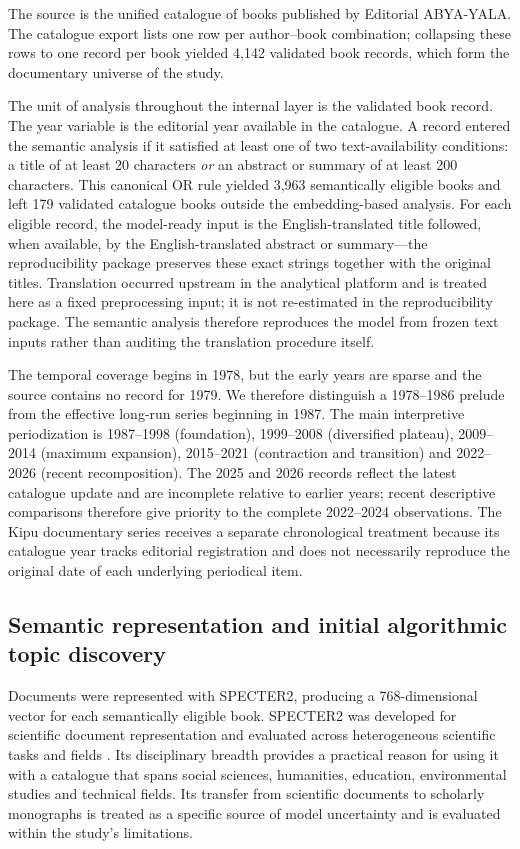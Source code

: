 \documentclass[futureinternet,article,submit,moreauthors]{Definitions/mdpi}
\newcommand{\ABYA}{ABYA-YALA\xspace}
\begin{document}
The source is the unified catalogue of books published by Editorial \ABYA. The catalogue export lists one row per author--book combination; collapsing these rows to one record per book yielded 4,142 validated book records, which form the documentary universe of the study. 

The unit of analysis throughout the internal layer is the validated book record. The year variable is the editorial year available in the catalogue. A record entered the semantic analysis if it satisfied at least one of two text-availability conditions: a title of at least 20 characters \emph{or} an abstract or summary of at least 200 characters. This canonical OR rule yielded 3,963 semantically eligible books and left 179 validated catalogue books outside the embedding-based analysis. For each eligible record, the model-ready input is the English-translated title followed, when available, by the English-translated abstract or summary---the reproducibility package preserves these exact strings together with the original titles. Translation occurred upstream in the analytical platform and is treated here as a fixed preprocessing input; it is not re-estimated in the reproducibility package. The semantic analysis therefore reproduces the model from frozen text inputs rather than auditing the translation procedure itself.

The temporal coverage begins in 1978, but the early years are sparse and the source contains no record for 1979. We therefore distinguish a 1978--1986 prelude from the effective long-run series beginning in 1987. The main interpretive periodization is 1987--1998 (foundation), 1999--2008 (diversified plateau), 2009--2014 (maximum expansion), 2015--2021 (contraction and transition) and 2022--2026 (recent recomposition). The 2025 and 2026 records reflect the latest catalogue update and are incomplete relative to earlier years; recent descriptive comparisons therefore give priority to the complete 2022--2024 observations. The Kipu documentary series receives a separate chronological treatment because its catalogue year tracks editorial registration and does not necessarily reproduce the original date of each underlying periodical item.

\subsection{Semantic representation and initial algorithmic topic discovery}\label{subsec:topicmodel}

Documents were represented with SPECTER2, producing a 768-dimensional vector for each semantically eligible book. SPECTER2 was developed for scientific document representation and evaluated across heterogeneous scientific tasks and fields \citep{singh2023scirepeval}. Its disciplinary breadth provides a practical reason for using it with a catalogue that spans social sciences, humanities, education, environmental studies and technical fields. Its transfer from scientific documents to scholarly monographs is treated as a specific source of model uncertainty and is evaluated within the study's limitations.
\end{document}
